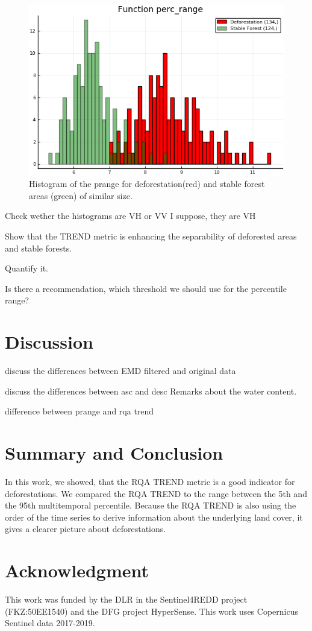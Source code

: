 \documentclass{article}
\begin{document}
\begin{figure}
  \includegraphics[width=\textwidth]{figs/histogram_percrange_0317_0319_polygon_5.png}
  \caption{Histogram of the prange for deforestation(red) and stable forest areas (green) of similar size.}
  \label{histprange}
\end{figure}

Check wether the histograms are VH or VV I suppose, they are VH

Show that the TREND metric is enhancing the separability of deforested areas and stable forests.

Quantify it.


Is there a recommendation, which threshold we should use for the percentile range?

\section{Discussion}

discuss the differences between EMD filtered and original data

discuss the differences between asc and desc
Remarks about the water content.


difference between prange and rqa trend



\section{Summary and Conclusion}
In this work, we showed, that the RQA TREND metric is a good indicator for deforestations.
We compared the RQA TREND to the range between the 5th and the 95th multitemporal percentile.
Because the RQA TREND is also using the order of the time series to derive information about the underlying land cover,
it gives a clearer picture about deforestations.



\section*{Acknowledgment}
This work was funded by the DLR in the Sentinel4REDD project (FKZ:50EE1540) and
the DFG project HyperSense.
This work uses Copernicus Sentinel data 2017-2019.




\end{document}
